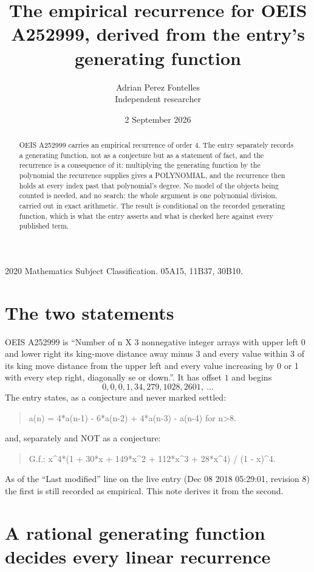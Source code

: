 \documentclass[11pt,a4paper]{article}
\title{The empirical recurrence for OEIS A252999, derived from the entry's generating function}
\author{Adrian Perez Fontelles\\ \small Independent researcher}
\date{2 September 2026}
\theoremstyle{plain}
\theoremstyle{definition}
\begin{document}
\maketitle

\begin{abstract}
OEIS A252999 carries an empirical recurrence of order $4$. The entry separately records a
generating function, not as a conjecture but as a statement of fact, and the recurrence is a
consequence of it: multiplying the generating function by the polynomial the recurrence
supplies gives a POLYNOMIAL, and the recurrence then holds at every index past that
polynomial's degree. No model of the objects being counted is needed, and no search: the
whole argument is one polynomial division, carried out in exact arithmetic. The result is
conditional on the recorded generating function, which is what the entry asserts and what is
checked here against every published term.
\end{abstract}

\noindent\small 2020 Mathematics Subject Classification. 05A15, 11B37, 30B10.\normalsize

\section{The two statements}

OEIS A252999 is ``Number of n X 3 nonnegative integer arrays with upper left 0 and lower right its king-move distance away minus 3 and every value within 3 of its king move distance from the upper left and every value increasing by 0 or 1 with every step right, diagonally se or down.''. It has offset $1$ and begins
\[
0, 0, 0, 1, 34, 279, 1028, 2601,\ \dots
\]
The entry states, as a conjecture and never marked settled:
\begin{quote}
a(n) = 4*a(n-1) - 6*a(n-2) + 4*a(n-3) - a(n-4) for n>8.
\end{quote}
and, separately and NOT as a conjecture:
\begin{quote}
G.f.: x\^{}4*(1 + 30*x + 149*x\^{}2 + 112*x\^{}3 + 28*x\^{}4) / (1 - x)\^{}4.
\end{quote}
As of the ``Last modified'' line on the live entry (Dec 08 2018 05:29:01, revision 8) the first is still
recorded as empirical. This note derives it from the second.

\section{A rational generating function decides every linear recurrence}
\end{document}
